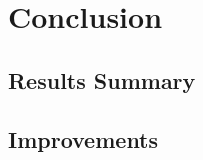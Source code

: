 \documentclass{article}
\begin{document}
\section{Conclusion}

\subsection{Results Summary}


\subsection{Improvements}
\subsection{}
\subsection{}




\end{document}

